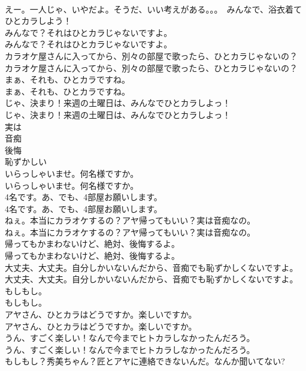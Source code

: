 \documentclass[8pt]{extreport}
\begin{document}
\begin{CJK}{UTF8}{min}
\\	えー。一人じゃ、いやだよ。そうだ、いい考えがある。。。　みんなで、浴衣着てひとカラしよう！ 
\\	みんなで？それはひとカラじゃないですよ。	
\\	みんなで？それはひとカラじゃないですよ。 
\\	カラオケ屋さんに入ってから、別々の部屋で歌ったら、ひとカラじゃないの？	
\\	カラオケ屋さんに入ってから、別々の部屋で歌ったら、ひとカラじゃないの？ 
\\	まぁ、それも、ひとカラですね。	
\\	まぁ、それも、ひとカラですね。 
\\	じゃ、決まり！来週の土曜日は、みんなでひとカラしよっ！	
\\	じゃ、決まり！来週の土曜日は、みんなでひとカラしよっ！ 
\\	実は
\\	音痴
\\	後悔
\\	恥ずかしい
\\	いらっしゃいませ。何名様ですか。	
\\	いらっしゃいませ。何名様ですか。 
\\	4名です。あ、でも、4部屋お願いします。	
\\	4名です。あ、でも、4部屋お願いします。 
\\	ねぇ。本当にカラオケするの？アヤ帰ってもいい？実は音痴なの。	
\\	ねぇ。本当にカラオケするの？アヤ帰ってもいい？実は音痴なの。 
\\	帰ってもかまわないけど、絶対、後悔するよ。	
\\	帰ってもかまわないけど、絶対、後悔するよ。 
\\	大丈夫、大丈夫。自分しかいないんだから、音痴でも恥ずかしくないですよ。	
\\	大丈夫、大丈夫。自分しかいないんだから、音痴でも恥ずかしくないですよ。 
\\	もしもし。	
\\	もしもし。 
\\	アヤさん、ひとカラはどうですか。楽しいですか。	
\\	アヤさん、ひとカラはどうですか。楽しいですか。 
\\	うん、すごく楽しい！なんで今までヒトカラしなかったんだろう。	
\\	うん、すごく楽しい！なんで今までヒトカラしなかったんだろう。 
\\	もしもし？秀美ちゃん？匠とアヤに連絡できないんだ。なんか聞いてない?	

\end{CJK}
\end{document}
